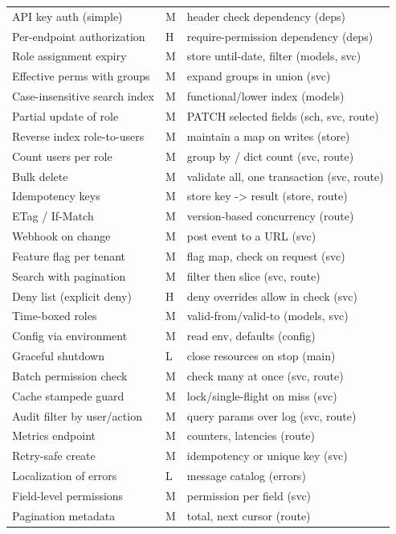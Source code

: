\documentclass[11pt,a4paper]{report}
\begin{document}
\begin{longtable}{p{} p{} p{}}
API key auth (simple) & M & header check dependency (deps) \\
Per-endpoint authorization & H & require-permission dependency (deps) \\
Role assignment expiry & M & store until-date, filter (models, svc) \\
Effective perms with groups & M & expand groups in union (svc) \\
Case-insensitive search index & M & functional/lower index (models) \\
Partial update of role & M & PATCH selected fields (sch, svc, route) \\
Reverse index role-to-users & M & maintain a map on writes (store) \\
Count users per role & M & group by / dict count (svc, route) \\
Bulk delete & M & validate all, one transaction (svc, route) \\
Idempotency keys & M & store key -> result (store, route) \\
ETag / If-Match & M & version-based concurrency (route) \\
Webhook on change & M & post event to a URL (svc) \\
Feature flag per tenant & M & flag map, check on request (svc) \\
Search with pagination & M & filter then slice (svc, route) \\
Deny list (explicit deny) & H & deny overrides allow in check (svc) \\
Time-boxed roles & M & valid-from/valid-to (models, svc) \\
Config via environment & M & read env, defaults (config) \\
Graceful shutdown & L & close resources on stop (main) \\
Batch permission check & M & check many at once (svc, route) \\
Cache stampede guard & M & lock/single-flight on miss (svc) \\
Audit filter by user/action & M & query params over log (svc, route) \\
Metrics endpoint & M & counters, latencies (route) \\
Retry-safe create & M & idempotency or unique key (svc) \\
Localization of errors & L & message catalog (errors) \\
Field-level permissions & M & permission per field (svc) \\
Pagination metadata & M & total, next cursor (route) \\

\end{longtable}
\end{document}
